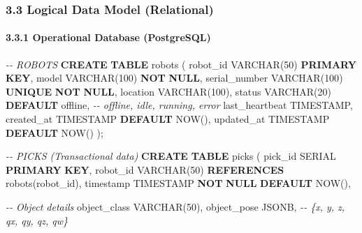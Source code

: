 \documentclass[
]{article}
\newenvironment{Shaded}{\begin{snugshade}}{\end{snugshade}}
\newcommand{\CommentTok}[1]{\textcolor[rgb]{0.56,0.35,0.01}{\textit{#1}}}
\newcommand{\DataTypeTok}[1]{\textcolor[rgb]{0.13,0.29,0.53}{#1}}
\newcommand{\DecValTok}[1]{\textcolor[rgb]{0.00,0.00,0.81}{#1}}
\newcommand{\KeywordTok}[1]{\textcolor[rgb]{0.13,0.29,0.53}{\textbf{#1}}}
\newcommand{\NormalTok}[1]{#1}
\newcommand{\StringTok}[1]{\textcolor[rgb]{0.31,0.60,0.02}{#1}}
\begin{document}
\hypertarget{logical-data-model-relational}{%
\subsubsection{3.3 Logical Data Model
(Relational)}\label{logical-data-model-relational}}

\hypertarget{operational-database-postgresql}{%
\paragraph{3.3.1 Operational Database
(PostgreSQL)}\label{operational-database-postgresql}}

\begin{Shaded}
\begin{Highlighting}[]
\CommentTok{{-}{-} ROBOTS}
\KeywordTok{CREATE} \KeywordTok{TABLE}\NormalTok{ robots (}
\NormalTok{    robot\_id }\DataTypeTok{VARCHAR}\NormalTok{(}\DecValTok{50}\NormalTok{) }\KeywordTok{PRIMARY} \KeywordTok{KEY}\NormalTok{,}
\NormalTok{    model }\DataTypeTok{VARCHAR}\NormalTok{(}\DecValTok{100}\NormalTok{) }\KeywordTok{NOT} \KeywordTok{NULL}\NormalTok{,}
\NormalTok{    serial\_number }\DataTypeTok{VARCHAR}\NormalTok{(}\DecValTok{100}\NormalTok{) }\KeywordTok{UNIQUE} \KeywordTok{NOT} \KeywordTok{NULL}\NormalTok{,}
\NormalTok{    location }\DataTypeTok{VARCHAR}\NormalTok{(}\DecValTok{100}\NormalTok{),}
\NormalTok{    status }\DataTypeTok{VARCHAR}\NormalTok{(}\DecValTok{20}\NormalTok{) }\KeywordTok{DEFAULT} \StringTok{\textquotesingle{}offline\textquotesingle{}}\NormalTok{,  }\CommentTok{{-}{-} offline, idle, running, error}
\NormalTok{    last\_heartbeat }\DataTypeTok{TIMESTAMP}\NormalTok{,}
\NormalTok{    created\_at }\DataTypeTok{TIMESTAMP} \KeywordTok{DEFAULT}\NormalTok{ NOW(),}
\NormalTok{    updated\_at }\DataTypeTok{TIMESTAMP} \KeywordTok{DEFAULT}\NormalTok{ NOW()}
\NormalTok{);}

\CommentTok{{-}{-} PICKS (Transactional data)}
\KeywordTok{CREATE} \KeywordTok{TABLE}\NormalTok{ picks (}
\NormalTok{    pick\_id SERIAL }\KeywordTok{PRIMARY} \KeywordTok{KEY}\NormalTok{,}
\NormalTok{    robot\_id }\DataTypeTok{VARCHAR}\NormalTok{(}\DecValTok{50}\NormalTok{) }\KeywordTok{REFERENCES}\NormalTok{ robots(robot\_id),}
    \DataTypeTok{timestamp} \DataTypeTok{TIMESTAMP} \KeywordTok{NOT} \KeywordTok{NULL} \KeywordTok{DEFAULT}\NormalTok{ NOW(),}

    \CommentTok{{-}{-} Object details}
\NormalTok{    object\_class }\DataTypeTok{VARCHAR}\NormalTok{(}\DecValTok{50}\NormalTok{),}
\NormalTok{    object\_pose JSONB,  }\CommentTok{{-}{-} \{x, y, z, qx, qy, qz, qw\}}


\end{Highlighting}
\end{Shaded}
\end{document}

